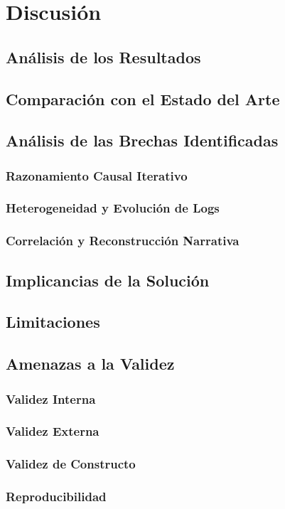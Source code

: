\chapter{Discusión}

\section{Análisis de los Resultados}

\section{Comparación con el Estado del Arte}

\section{Análisis de las Brechas Identificadas}

\subsection{Razonamiento Causal Iterativo}

\subsection{Heterogeneidad y Evolución de Logs}

\subsection{Correlación y Reconstrucción Narrativa}

\section{Implicancias de la Solución}

\section{Limitaciones}

\section{Amenazas a la Validez}

\subsection{Validez Interna}

\subsection{Validez Externa}

\subsection{Validez de Constructo}

\subsection{Reproducibilidad}